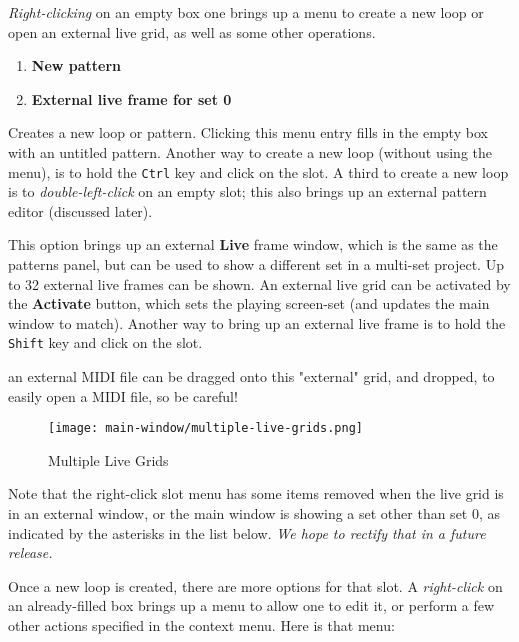    \textsl{Right-clicking} on an empty box one brings up a menu to create
   a new loop or open an external live grid, as well as some other operations.

   \begin{enumerate}
      \item \textbf{New pattern}
      \item \textbf{External live frame for set 0}
   \end{enumerate}

   \setcounter{ItemCounter}{0}      %

   Creates a new loop or pattern.
   Clicking this menu entry fills in the empty box with an untitled
   pattern.
   Another way to create a new loop (without using the menu), is
   to hold the \texttt{Ctrl} key and click on the slot.
   A third to create a new loop is to
   \textsl{double-left-click} on an
   empty slot; this also brings up an external pattern editor (discussed
   later).

   This option brings up an external \textbf{Live} frame window, which
   is the same as the patterns panel, but can be used to show a different set
   in a multi-set project.  Up to 32 external live frames can be shown.
   An external live grid can be activated by the \textbf{Activate} button,
   which sets the playing screen-set
   (and updates the main window to match).
   Another way to bring up an external live frame
   is to hold the \texttt{Shift} key and click on the slot.

   an external MIDI file can be dragged onto this "external" grid,
   and dropped, to easily open a MIDI file, so be careful!

\begin{figure}[H]
   \centering 
   \texttt{[image: main-window/multiple-live-grids.png]}
   \caption{Multiple Live Grids}
   \label{fig:multiple_live_grids}
\end{figure}

   Note that the right-click slot menu has some items removed when the live
   grid is in an external window, or the main window is showing a set other
   than set 0, as indicated by
   the asterisks in the list below.
   \textsl{We hope to rectify that in a future release.}

   Once a new loop is created, there are more options for that slot.
   A \textsl{right-click} on an already-filled box brings up a menu
   to allow one to edit it, or perform a few other actions
   specified in the context menu.  Here is that menu:

